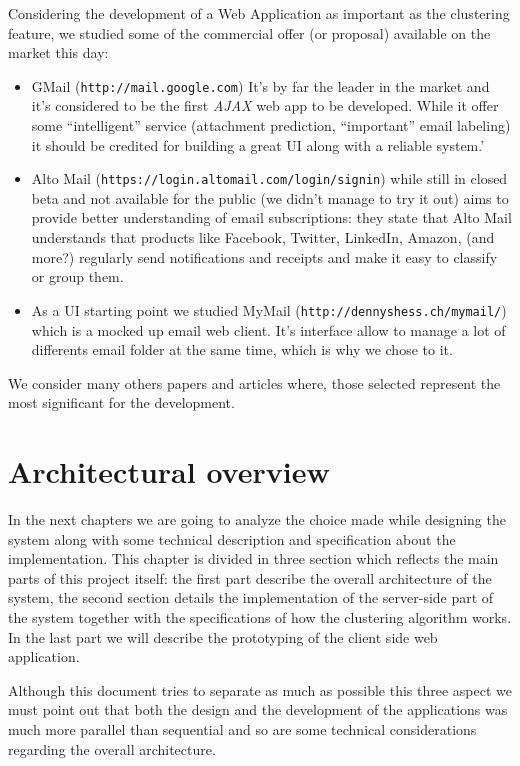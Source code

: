 \documentclass[a4paper,12pt]{report}
\begin{document}
Considering the development of a Web Application as important as the clustering feature, we studied some of the commercial offer (or proposal) available on the market this day:
\begin{itemize}
\item GMail (\texttt{http://mail.google.com}) It's by far the leader in the market and it's considered to be the first \emph{AJAX} web app to be developed. While it offer some ``intelligent'' service (attachment prediction, ``important'' email labeling) it should be credited for building a great UI along with a reliable system.'
\item Alto Mail (\texttt{https://login.altomail.com/login/signin}) while still in closed beta and not available for the public (we didn't manage to try it out) aims to provide better understanding of email subscriptions: they state that Alto Mail understands that products like Facebook, Twitter, LinkedIn, Amazon, (and more?) regularly send notifications and receipts and make it easy to classify or group them. 
\item As a UI starting point we studied MyMail (\texttt{http://dennyshess.ch/mymail/}) which is a mocked up email web client. It's interface allow to manage a lot of differents email folder at the same time, which is why we chose to it.
\end{itemize}
We consider many others papers and articles where, those selected represent the most significant for the development.
 

\chapter{Architectural overview}
In the next chapters we are going to analyze the choice made while designing the system along with some technical description and specification about the implementation. This chapter is divided in three section which reflects the main parts of this project itself: the first part describe the overall architecture of the system, the second section details the implementation of the server-side part of the system together with the specifications of how the clustering algorithm works. In the last part we will describe the prototyping of the client side web application.

Although this document tries to separate as much as possible this three aspect we must point out that both the design and the development of the applications was much more parallel than sequential and so are some technical considerations regarding the overall architecture.
\end{document}
